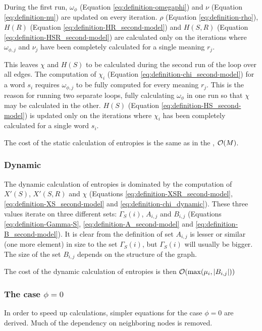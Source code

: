 During the first run, $\omega_\phi$ (Equation \eqref{eq:definition-omegaphi}) and $\nu$ (Equation \eqref{eq:definition-nu}) are updated on every iteration.
$\rho$ (Equation \eqref{eq:definition-rho}), $H(R)$ (Equation \eqref{eq:definition-HR_second-model}) and $H(S,R)$ (Equation \eqref{eq:definition-HSR_second-model}) are calculated only on the iterations where $\omega_{\phi,j}$ and $\nu_j$ have been completely calculated for a single meaning $r_j$.

This leaves $\chi$ and $H(S)$ to be calculated during the second run of the loop over all edges.
The computation of $\chi_i$ (Equation \eqref{eq:definition-chi_second-model}) for a word $s_i$ requires $\omega_{\phi,j}$ to be fully computed for every meaning $r_j$.
This is the reason for running two separate loops, fully calculating $\omega_\phi$ in one run so that $\chi$ may be calculated in the other.
$H(S)$ (Equation \eqref{eq:definition-HS_second-model}) is updated only on the iterations where $\chi_i$ has been completely calculated for a single word $s_i$.

The cost of the static calculation of entropies is the same as in the \firstmodel, $\mathcal{O}(M)$.

\subsubsection{Dynamic}

The dynamic calculation of entropies is dominated by the computation of $X'(S)$, $X'(S,R)$ and $\chi$ (Equations \eqref{eq:definition-XSR_second-model}, \eqref{eq:definition-XS_second-model} and \eqref{eq:definition-chi_dynamic}).
These three values iterate on three different sets: $\Gamma_S(i)$, $A_{i,j}$ and $B_{i,j}$ (Equations \eqref{eq:definition-Gamma-S}, \eqref{eq:definition-A_second-model} and \eqref{eq:definition-B_second-model}).
It is clear from the definition of set $A_{i,j}$ is lesser or similar (one more element) in size to the set $\Gamma_S(i)$, but $\Gamma_S(i)$ will usually be bigger.
The size of the set $B_{i,j}$ depends on the structure of the graph.

The cost of the dynamic calculation of entropies is then $\mathcal{O}(\max(\mu_i,|B_{i,j}|))$

\subsubsection{The case $\phi=0$}

In order to speed up calculations, simpler equations for the case $\phi=0$ are derived. Much of the dependency on neighboring nodes is removed.

